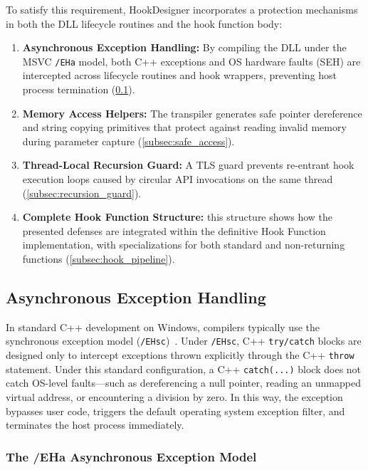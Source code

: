 To satisfy this requirement, HookDesigner incorporates a protection mechanisms in both the DLL lifecycle routines and the hook function body:
\begin{enumerate}
	\item \textbf{Asynchronous Exception Handling:} By compiling the DLL under the MSVC \texttt{/EHa} model, both C++ exceptions and OS hardware faults (\ac{SEH}) are intercepted across lifecycle routines and hook wrappers, preventing host process termination (\cref{subsec:seh}).
	\item \textbf{Memory Access Helpers:} The transpiler generates safe pointer dereference and string copying primitives that protect against reading invalid memory during parameter capture (\cref{subsec:safe_access}).
	\item \textbf{Thread-Local Recursion Guard:} A TLS guard prevents re-entrant hook execution loops caused by circular API invocations on the same thread (\cref{subsec:recursion_guard}).
	\item \textbf{Complete Hook Function Structure:} this structure shows how the presented defenses are integrated within the definitive Hook Function implementation, with specializations for both standard and non-returning functions (\cref{subsec:hook_pipeline}).
\end{enumerate}

\subsection{Asynchronous Exception Handling}
\label{subsec:seh}

In standard C++ development on Windows, compilers typically use the synchronous exception model (\texttt{/EHsc})~\cite{doc:msvc_eh}.
Under \texttt{/EHsc}, C++ \texttt{try/catch} blocks are designed only to intercept exceptions thrown explicitly through the C++ \texttt{throw} statement.
Under this standard configuration, a C++ \texttt{catch(...)} block does not catch OS-level faults---such as dereferencing a null pointer, reading an unmapped virtual address, or encountering a division by zero.
In this way, the exception bypasses user code, triggers the default operating system exception filter, and terminates the host process immediately.

\subsubsection{The /EHa Asynchronous Exception Model}

